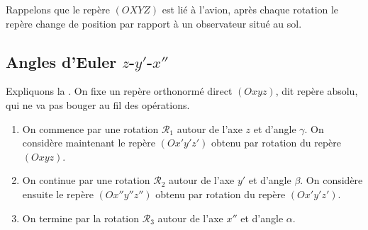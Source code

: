 \documentclass[11pt,class=report,crop=false]{standalone}
\begin{document}
Rappelons que le repère $(OXYZ)$ est lié à l'avion, après chaque rotation le repère change de position par rapport à un observateur situé au sol.



\subsection{Angles d'Euler $z$-$y'$-$x''$}

Expliquons la .
On fixe un repère orthonormé direct $(Oxyz)$, dit repère absolu, qui ne va pas bouger au fil des opérations.

\begin{enumerate}
  \item On commence par une rotation $\mathcal{R}_1$ autour de l'axe $z$ et d'angle $\gamma$. On considère maintenant le repère $(Ox'y'z')$ obtenu par rotation du repère $(Oxyz)$.
 
  \item On continue par une rotation $\mathcal{R}_2$ autour de l'axe $y'$ et d'angle $\beta$.
  On considère ensuite le repère $(Ox''y''z'')$ obtenu par rotation du repère $(Ox'y'z')$.

  \item On termine par la rotation $\mathcal{R}_3$ autour de l'axe $x''$ et d'angle $\alpha$.
\end{enumerate}

\begin{center}
	\begin{minipage}{0.45\textwidth}
	\end{minipage}
		\qquad
	\begin{minipage}{0.45\textwidth}	
	\end{minipage}	
\end{center}
	
\begin{center}
	\begin{minipage}{0.45\textwidth}
	\end{minipage}
	\qquad
	\begin{minipage}{0.45\textwidth}	
	\end{minipage}	
\end{center}
\end{document}
